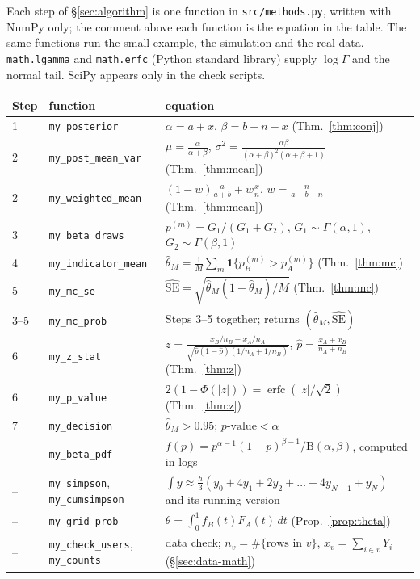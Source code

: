 \documentclass[11pt]{article}
\theoremstyle{definition}
\theoremstyle{remark}
\newcommand{\Bfun}{\mathrm{B}}
\newcommand{\ind}[1]{\mathbf{1}\{#1\}}
\begin{document}
Each step of \S\ref{sec:algorithm} is one function in \texttt{src/methods.py}, written with NumPy only; the comment
above each function is the equation in the table. The same functions run the small example, the simulation and
the real data. \texttt{math.lgamma} and \texttt{math.erfc} (Python standard library) supply $\log\Gamma$ and the
normal tail. SciPy appears only in the check scripts.

\begin{center}\small
\begin{tabular}{l l p{7.6cm}}\toprule
Step & function & equation\\ \midrule
1 & \texttt{my\_posterior} & $\alpha=a+x$, $\beta=b+n-x$ \hfill (Thm.~\ref{thm:conj})\\
2 & \texttt{my\_post\_mean\_var} & $\mu=\frac{\alpha}{\alpha+\beta}$, $\sigma^2=\frac{\alpha\beta}{(\alpha+\beta)^2(\alpha+\beta+1)}$ \hfill (Thm.~\ref{thm:mean})\\
2 & \texttt{my\_weighted\_mean} & $(1-w)\frac a{a+b}+w\frac xn$, $w=\frac n{a+b+n}$ \hfill (Thm.~\ref{thm:mean})\\
3 & \texttt{my\_beta\_draws} & $p^{(m)}=G_1/(G_1+G_2)$, $G_1\sim\Gamma(\alpha,1)$, $G_2\sim\Gamma(\beta,1)$\\
4 & \texttt{my\_indicator\_mean} & $\hat\theta_M=\frac1M\sum_m\ind{p_B^{(m)}>p_A^{(m)}}$ \hfill (Thm.~\ref{thm:mc})\\
5 & \texttt{my\_mc\_se} & $\widehat{\mathrm{SE}}=\sqrt{\hat\theta_M(1-\hat\theta_M)/M}$ \hfill (Thm.~\ref{thm:mc})\\
3--5 & \texttt{my\_mc\_prob} & Steps 3--5 together; returns $(\hat\theta_M,\widehat{\mathrm{SE}})$\\
6 & \texttt{my\_z\_stat} & $z=\frac{x_B/n_B-x_A/n_A}{\sqrt{\hat p(1-\hat p)(1/n_A+1/n_B)}}$, $\hat p=\frac{x_A+x_B}{n_A+n_B}$ \hfill (Thm.~\ref{thm:z})\\
6 & \texttt{my\_p\_value} & $2(1-\Phi(|z|))=\operatorname{erfc}(|z|/\sqrt2)$ \hfill (Thm.~\ref{thm:z})\\
7 & \texttt{my\_decision} & $\hat\theta_M>0.95$; $p\text{-value}<\alpha$\\ \midrule
-- & \texttt{my\_beta\_pdf} & $f(p)=p^{\alpha-1}(1-p)^{\beta-1}/\Bfun(\alpha,\beta)$, computed in logs\\
-- & \texttt{my\_simpson}, \texttt{my\_cumsimpson} & $\int y\approx\frac h3(y_0+4y_1+2y_2+\dots+4y_{N-1}+y_N)$ and its running version\\
-- & \texttt{my\_grid\_prob} & $\theta=\int_0^1 f_B(t)F_A(t)\,dt$ \hfill (Prop.~\ref{prop:theta})\\
-- & \texttt{my\_check\_users}, \texttt{my\_counts} & data check; $n_v=\#\{\text{rows in }v\}$, $x_v=\sum_{i\in v}Y_i$ \hfill (\S\ref{sec:data-math})\\
\bottomrule\end{tabular}\normalsize
\end{center}
\end{document}
